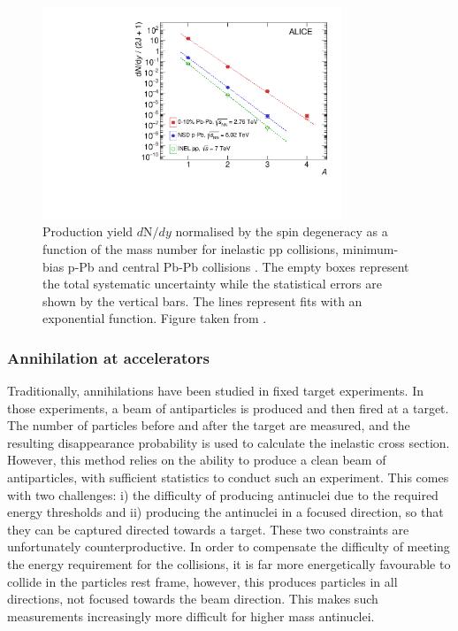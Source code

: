 \begin{figure}[h!]
    \centering
    \includegraphics[width=0.8\textwidth]{figures/PenaltyFactor-97548.pdf}
    \caption{Production yield $d\mathrm{N}/dy$  normalised by the spin degeneracy as a function of the mass number for inelastic pp collisions, minimum-bias p-Pb and central Pb-Pb collisions . The empty boxes represent the total systematic uncertainty while the statistical errors are shown by the vertical bars. The lines represent fits with an exponential function. Figure taken from \cite{antinuclei_mult_dependence}.  }
    \label{fig:PenaltyFactorNuclei}
\end{figure}



\subsubsection{Annihilation at accelerators}
Traditionally, annihilations have been studied in fixed target experiments\cite{}. In those experiments, a beam of antiparticles is produced and then fired at a target. The number of particles before and after the target are measured, and the resulting disappearance probability is used to calculate the inelastic cross section. However, this method relies on the ability to produce a clean beam of antiparticles, with sufficient statistics to conduct such an experiment. This comes with two challenges: i) the difficulty of producing antinuclei due to the required energy thresholds and ii) producing the antinuclei in a focused direction, so that they can be captured directed towards a target. These two constraints are unfortunately counterproductive. In order to compensate the difficulty of meeting the energy requirement for the collisions, it is far more energetically favourable to collide in the particles rest frame, however, this produces particles in all directions, not focused towards the beam direction. This makes such measurements increasingly more difficult for higher mass antinuclei.\\

